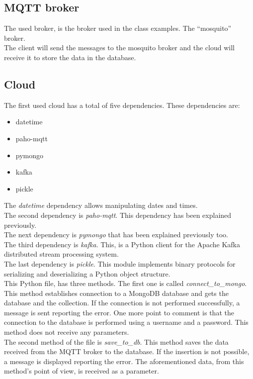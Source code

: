 \documentclass[a4paper,12pt]{article}
\begin{document}
\subsection*{MQTT broker}
The used broker, is the broker used in the class examples. The “mosquito” broker.\\
The client will send the messages to the mosquito broker and the cloud will receive it to store the data in the database.

\subsection*{Cloud}
The first used cloud has a total of five dependencies. These dependencies are:
\begin{itemize}
    \item datetime
    \item paho-mqtt
    \item pymongo
    \item kafka
    \item pickle
\end{itemize}
The \textit{datetime} dependency allows manipulating dates and times.\\
The second dependency is \textit{paho-mqtt}. This dependency has been explained previously.\\
The next dependency is \textit{pymongo} that has been explained previously too.\\
The third dependency is \textit{kafka}. This, is a Python client for the Apache Kafka distributed stream processing system.\\
The last dependency is \textit{pickle}. This module implements binary protocols for serializing and deserializing a Python object structure.\\
This Python file, has three methods. The first one is called \textit{connect\_to\_mongo}. This method establishes connection to a MongoDB database and gets the database and the collection. If the connection is not performed successfully, a message is sent reporting the error. One more point to comment is that the connection to the database is performed using a username and a password. This method does not receive any parameters.\\
The second method of the file is \textit{save\_to\_db}. This method saves the data received from the MQTT broker to the database. If the insertion is not possible, a message is displayed reporting the error. The aforementioned data, from this method's point of view, is received as a parameter.\\
\end{document}
